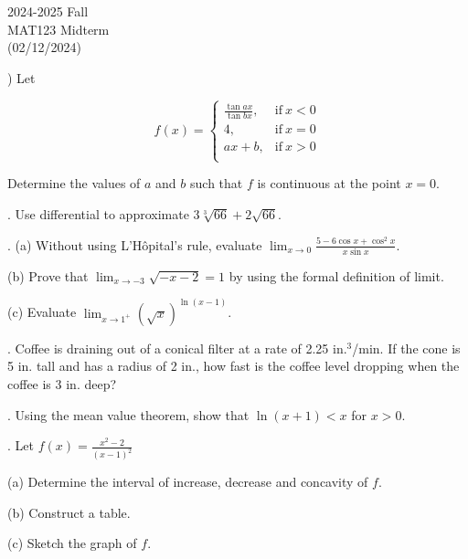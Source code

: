 \documentclass{article}
\begin{document}
\pagestyle{empty}
\large

\begin{center}
2024-2025 Fall \\MAT123 Midterm\\(02/12/2024)
\end{center}

) Let

\[
f(x) =
\begin{cases}
\displaystyle \frac{\tan ax}{\tan bx}, & \text{if}\ x < 0 \\
4, & \text{if}\ x = 0 \\
ax+b, & \text{if}\ x >0 \\
\end{cases}
\]

\hfill

\noindent Determine the values of $a$ and $b$ such that $f$ is continuous at the point $x=0$.

\hfill

. Use differential to approximate $3\sqrt[3]{66}+2\sqrt{66}$.

\hfill

. (a) Without using L'Hôpital's rule, evaluate $\displaystyle \lim_{x\to 0} \frac{5-6\cos x + \cos^2x}{x\sin x}$.

\hfill

\noindent (b) Prove that $\displaystyle \lim_{x\to -3} \sqrt{-x-2} = 1$ by using the formal definition of limit.

\hfill

\noindent (c) Evaluate $\displaystyle\lim_{x\to1^+} (\sqrt x)^{\ln(x-1)}$.

\hfill

. Coffee is draining out of a conical filter at a rate of 2.25 in.$^3$/min. If the cone is 5 in. tall and has a radius of 2 in., how fast is the coffee level dropping when the coffee is 3 in. deep?

\hfill

. Using the mean value theorem, show that $\ln(x+1) < x$ for $x > 0$.

\hfill

. Let $\displaystyle f(x) = \frac{x^2-2}{(x-1)^2}$

\hfill

(a) Determine the interval of increase, decrease and concavity of $f$.

(b) Construct a table.

(c) Sketch the graph of $f$.
\end{document}
